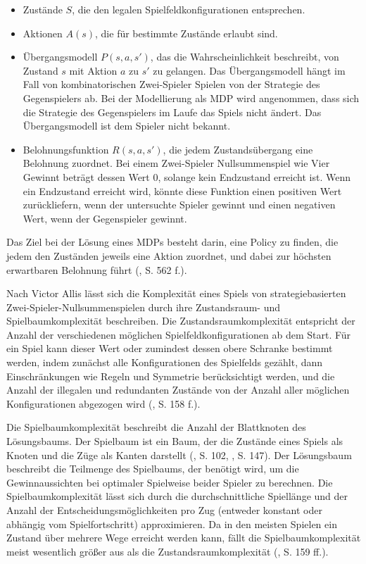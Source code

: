 \begin{itemize}
	
\item Zustände $S$, die den legalen Spielfeldkonfigurationen entsprechen.
\item Aktionen $A(s)$, die für bestimmte Zustände erlaubt sind.
\item Übergangsmodell $P(s, a, s')$, das die Wahrscheinlichkeit beschreibt, von Zustand $s$ mit Aktion $a$ zu $s'$ zu gelangen. Das Übergangsmodell hängt im Fall von kombinatorischen Zwei-Spieler Spielen von der Strategie des Gegenspielers ab. Bei der Modellierung als MDP wird angenommen, dass sich die Strategie des Gegenspielers im Laufe das Spiels nicht ändert. Das Übergangsmodell ist dem Spieler nicht bekannt.
\item Belohnungsfunktion $R(s, a, s')$, die jedem Zustandsübergang eine Belohnung zuordnet. Bei einem Zwei-Spieler Nullsummenspiel wie Vier Gewinnt beträgt dessen Wert 0, solange kein Endzustand erreicht ist. Wenn ein Endzustand erreicht wird, könnte diese Funktion einen positiven Wert zurückliefern, wenn der untersuchte Spieler gewinnt und einen negativen Wert, wenn der Gegenspieler gewinnt.

\end{itemize}

Das Ziel bei der Lösung eines MDPs besteht darin, eine Policy zu finden, die jedem den Zuständen jeweils eine Aktion zuordnet, und dabei zur höchsten erwartbaren Belohnung führt (\cite{Russell.2020}, S. 562 f.).


Nach Victor Allis lässt sich die Komplexität eines Spiels von strategiebasierten Zwei-Spieler-Nullsummenspielen durch ihre Zustandsraum- und Spielbaumkomplexität beschreiben. Die Zustandsraumkomplexität entspricht der Anzahl der verschiedenen möglichen Spielfeldkonfigurationen ab dem Start. Für ein Spiel kann dieser Wert oder zumindest dessen obere Schranke bestimmt werden, indem zunächst alle Konfigurationen des Spielfelds gezählt, dann Einschränkungen wie Regeln und Symmetrie berücksichtigt werden, und die Anzahl der illegalen und redundanten Zustände von der Anzahl aller möglichen Konfigurationen abgezogen wird (\cite{Allis.1994}, S. 158 f.).

Die Spielbaumkomplexität beschreibt die Anzahl der Blattknoten des Lösungsbaums. Der Spielbaum ist ein Baum, der die Zustände eines Spiels als Knoten und die Züge als Kanten darstellt (\cite{Bewersdorff.2018}, S. 102, \cite{Russell.2020}, S. 147). Der Lösungsbaum beschreibt die Teilmenge des Spielbaums, der benötigt wird, um die Gewinnaussichten bei optimaler Spielweise beider Spieler zu berechnen. Die Spielbaumkomplexität lässt sich durch die durchschnittliche Spiellänge und der Anzahl der Entscheidungsmöglichkeiten pro Zug (entweder konstant oder abhängig vom Spielfortschritt) approximieren. Da in den meisten Spielen ein Zustand über mehrere Wege erreicht werden kann, fällt die Spielbaumkomplexität meist wesentlich größer aus als die Zustandsraumkomplexität (\cite{Allis.1994}, S. 159 ff.).

